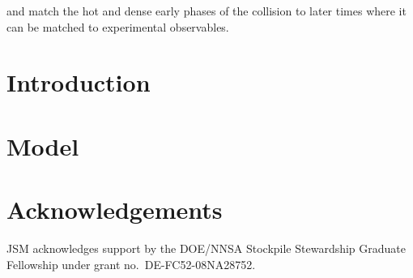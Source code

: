 \documentclass[aps,prc,reprint,amsmath,nofootinbib]{revtex4-1}
\begin{document}
and match the hot and dense early phases of the collision to later times where it can be matched to experimental observables.




\section{Introduction}


\section{Model}

\section{Acknowledgements}

\medskip
JSM acknowledges support by the DOE/NNSA Stockpile Stewardship Graduate Fellowship under grant no.~DE-FC52-08NA28752.

%
\end{document}
